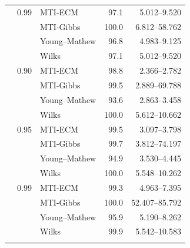 \begin{longtable}{@{}rrlrr@{}}
\addlinespace[0.3em]
500 & 0.99 & MTI-ECM & 97.1 & 5.012--9.520 \\
 &  & MTI-Gibbs & 100.0 & 6.812--58.762 \\
 &  & Young--Mathew & 96.8 & 4.983--9.125 \\
 &  & Wilks & 97.1 & 5.012--9.520 \\
\addlinespace[0.3em]
1000 & 0.90 & MTI-ECM & 98.8 & 2.366--2.782 \\
 &  & MTI-Gibbs & 99.5 & 2.889--69.788 \\
 &  & Young--Mathew & 93.6 & 2.863--3.458 \\
 &  & Wilks & 100.0 & 5.612--10.662 \\
\addlinespace[0.3em]
1000 & 0.95 & MTI-ECM & 99.5 & 3.097--3.798 \\
 &  & MTI-Gibbs & 99.7 & 3.812--74.197 \\
 &  & Young--Mathew & 94.9 & 3.530--4.445 \\
 &  & Wilks & 100.0 & 5.548--10.262 \\
\addlinespace[0.3em]
1000 & 0.99 & MTI-ECM & 99.3 & 4.963--7.395 \\
 &  & MTI-Gibbs & 100.0 & 52.407--85.792 \\
 &  & Young--Mathew & 95.9 & 5.190--8.262 \\
 &  & Wilks & 99.9 & 5.542--10.583 \\
\addlinespace[0.3em]
\end{longtable}
\clearpage
